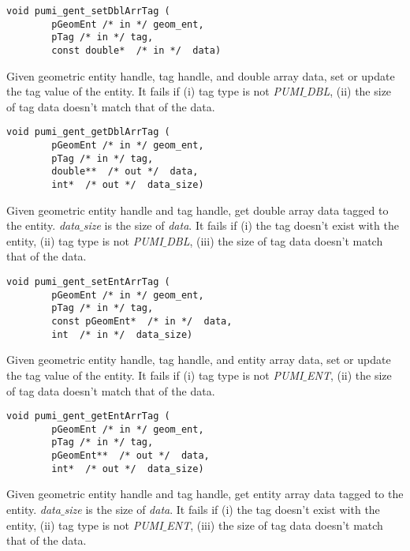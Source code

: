 \begin{verbatim} 
void pumi_gent_setDblArrTag (
        pGeomEnt /* in */ geom_ent, 
        pTag /* in */ tag,
        const double*  /* in */  data)
\end{verbatim}\vspace{-.5cm}\hspace{1cm}
        Given geometric entity handle, tag handle, and double array data, set or update the tag value of the entity. It fails if (i) tag type is not \emph{PUMI}$\_$\emph{DBL}, (ii) the size of tag data doesn't match that of the data.

\begin{verbatim} 
void pumi_gent_getDblArrTag (
        pGeomEnt /* in */ geom_ent, 
        pTag /* in */ tag,
        double**  /* out */  data, 
        int*  /* out */  data_size)
\end{verbatim}\vspace{-.5cm}\hspace{1cm}
        Given geometric entity handle and tag handle, get double array data tagged to the entity.  \emph{data}$\_$\emph{size} is the size of \emph{data}. It fails if (i) the tag doesn't exist with the entity, (ii) tag type is not \emph{PUMI}$\_$\emph{DBL}, (iii) the size of tag data doesn't match that of the data.

\begin{verbatim} 
void pumi_gent_setEntArrTag (
        pGeomEnt /* in */ geom_ent, 
        pTag /* in */ tag, 
        const pGeomEnt*  /* in */  data, 
        int  /* in */  data_size)
\end{verbatim}\vspace{-.5cm}\hspace{1cm}
        Given geometric entity handle, tag handle, and entity array data, set or update the tag value of the entity.  It fails if (i) tag type is not \emph{PUMI}$\_$\emph{ENT}, (ii) the size of tag data doesn't match that of the data.

\begin{verbatim} 
void pumi_gent_getEntArrTag (
        pGeomEnt /* in */ geom_ent, 
        pTag /* in */ tag,
        pGeomEnt**  /* out */  data, 
        int*  /* out */  data_size)
\end{verbatim}\vspace{-.5cm}\hspace{1cm}
        Given geometric entity handle and tag handle, get entity array data tagged to the entity. \emph{data}$\_$\emph{size} is the size of \emph{data}. It fails if (i) the tag doesn't exist with the entity, (ii) tag type is not \emph{PUMI}$\_$\emph{ENT}, (iii) the size of tag data doesn't match that of the data.
